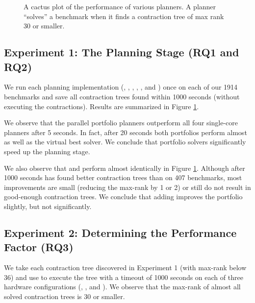\begin{figure}
	\centering
	
    \vspace*{-0.7cm}
	\caption{\label{fig:planning} A cactus plot of the performance of various planners. A planner ``solves'' a benchmark when it finds a contraction tree of max rank 30 or smaller.}
\end{figure}

\subsection{Experiment 1: The Planning Stage (RQ1 and RQ2)}
We run each planning implementation (, , , , , and ) once on each of our 1914 benchmarks and save all contraction trees found within 1000 seconds (without executing the contractions). Results are summarized in Figure \ref{fig:planning}. 


%


We observe that the parallel portfolio planners outperform all four single-core planners after 5 seconds. In fact, after 20 seconds both portfolios perform almost as well as the virtual best solver. We conclude that portfolio solvers significantly speed up the planning stage.

We also observe that  and  perform almost identically in Figure \ref{fig:planning}. Although after 1000 seconds  has found better contraction trees than  on 407 benchmarks, most improvements are small (reducing the max-rank by 1 or 2) or still do not result in good-enough contraction trees. We conclude that adding  improves the portfolio slightly, but not significantly.
 
\subsection{Experiment 2: Determining the Performance Factor (RQ3)}
\label{sec:experiments:pf}
We take each contraction tree discovered in Experiment 1 (with max-rank below 36) and use  to execute the tree with a timeout of 1000 seconds on each of three hardware configurations (, , and ). We observe that the max-rank of almost all solved contraction trees is 30 or smaller.

